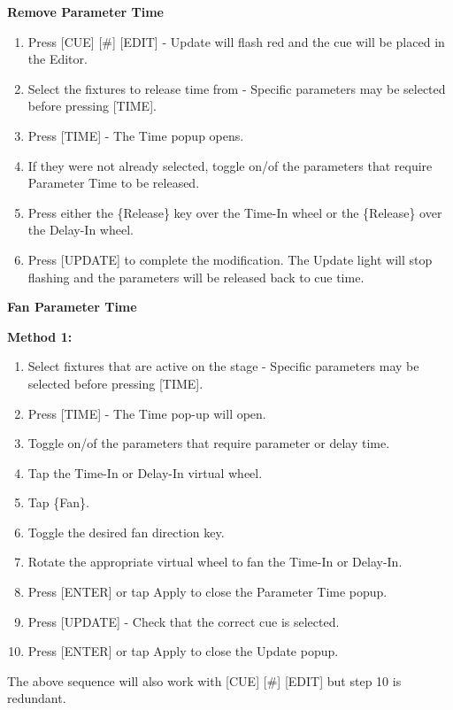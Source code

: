 \documentclass[
]{article}
\begin{document}
\textbf{Remove Parameter Time}

\begin{enumerate}
\def\labelenumi{\arabic{enumi}.}
\item
  Press {[}CUE{]} {[}\#{]} {[}EDIT{]} - Update will flash red and the cue will be placed in the Editor.
\item
  Select the fixtures to release time from - Specific parameters may be selected before pressing {[}TIME{]}.
\item
  Press {[}TIME{]} - The Time popup opens.
\item
  If they were not already selected, toggle on/of the parameters that require Parameter Time to be released.
\item
  Press either the \{Release\} key over the Time-In wheel or the \{Release\} over the Delay-In wheel.
\item
  Press {[}UPDATE{]} to complete the modification. The Update light will stop flashing and the parameters will be released back to cue time.
\end{enumerate}

\textbf{Fan Parameter Time}

\textbf{Method 1:}

\begin{enumerate}
\def\labelenumi{\arabic{enumi}.}
\item
  Select fixtures that are active on the stage - Specific parameters may be selected before pressing {[}TIME{]}.
\item
  Press {[}TIME{]} - The Time pop-up will open.
\item
  Toggle on/of the parameters that require parameter or delay time.
\item
  Tap the Time-In or Delay-In virtual wheel.
\item
  Tap \{Fan\}.
\item
  Toggle the desired fan direction key.
\item
  Rotate the appropriate virtual wheel to fan the Time-In or Delay-In.
\item
  Press {[}ENTER{]} or tap Apply to close the Parameter Time popup.
\item
  Press {[}UPDATE{]} - Check that the correct cue is selected.
\item
  Press {[}ENTER{]} or tap Apply to close the Update popup.
\end{enumerate}

The above sequence will also work with {[}CUE{]} {[}\#{]} {[}EDIT{]} but step 10 is redundant.
\end{document}

